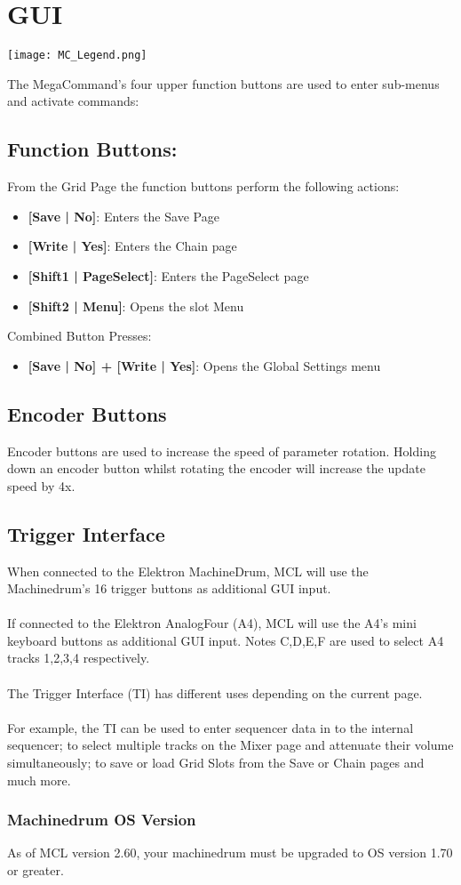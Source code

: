 \chapter{GUI}

\begin{center}
  \texttt{[image: MC\_Legend.png]}
\end{center}

The MegaCommand's four upper function buttons are used to enter sub-menus and activate commands:
\section{Function Buttons:}
From the Grid Page the function buttons perform the following actions:
\begin{itemize}
\item{\textbf{[Save | No]}: Enters the Save Page}
\item{\textbf{[Write | Yes]}: Enters the Chain page}
\item{\textbf{[Shift1 | PageSelect]}: Enters the PageSelect page}
\item{\textbf{[Shift2 | Menu]}: Opens the slot Menu }
\end{itemize}
Combined Button Presses:
\begin{itemize}
\item{\textbf{[Save | No] + [Write | Yes]}: Opens the Global Settings menu }
\end{itemize}

\section{Encoder Buttons}
Encoder buttons are used to increase the speed of parameter rotation.
Holding down an encoder button whilst rotating the encoder will increase the update speed by 4x.

\section{Trigger Interface}
When connected to the Elektron MachineDrum, MCL will use the Machinedrum's 16 trigger buttons as additional GUI input. \\
\\
If connected to the Elektron AnalogFour (A4), MCL will use the A4's mini keyboard buttons as additional GUI input. Notes C,D,E,F are used to select A4 tracks 1,2,3,4 respectively.\\
\\
The Trigger Interface (TI) has different uses depending on the current page.\\
\\For example, the TI can be used to enter sequencer data in to the internal sequencer;
to select multiple tracks on the Mixer page and attenuate their volume simultaneously; to save or load Grid Slots from the Save or Chain pages and much more.

\subsection{Machinedrum OS Version}
As of MCL version 2.60, your machinedrum must be upgraded to OS version 1.70 or greater.

